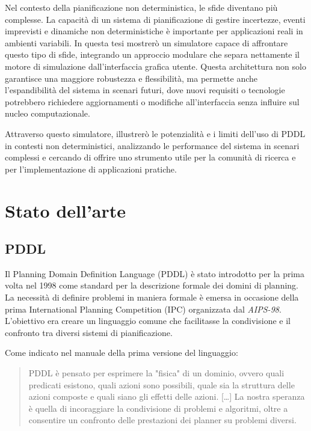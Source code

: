 \documentclass[a4paper, 11pt, titlepage, twoside, openany]{book}
\begin{document}
Nel contesto della pianificazione non deterministica, le sfide diventano più complesse. La capacità di un sistema di pianificazione di gestire incertezze, eventi imprevisti e dinamiche non deterministiche è importante per applicazioni reali in ambienti variabili. In questa tesi mostrerò un simulatore capace di affrontare questo tipo di sfide, integrando un approccio modulare che separa nettamente il motore di simulazione dall'interfaccia grafica utente. Questa architettura non solo garantisce una maggiore robustezza e flessibilità, ma permette anche l'espandibilità del sistema in scenari futuri, dove nuovi requisiti o tecnologie potrebbero richiedere aggiornamenti o modifiche all'interfaccia senza influire sul nucleo computazionale.

Attraverso questo simulatore, illustrerò le potenzialità e i limiti dell'uso di PDDL in contesti non deterministici, analizzando le performance del sistema in scenari complessi e cercando di offrire uno strumento utile per la comunità di ricerca e per l'implementazione di applicazioni pratiche.

\chapter{Stato dell'arte}
\section{PDDL}
Il Planning Domain Definition Language (PDDL) è stato introdotto per la prima volta nel 1998 come standard per la descrizione formale dei domini di planning. La necessità di definire problemi in maniera formale è emersa in occasione della prima International Planning Competition (IPC) organizzata dal \textit{AIPS-98}\cite{AIPS98}. L'obiettivo era creare un linguaggio comune che facilitasse la condivisione e il confronto tra diversi sistemi di pianificazione.

Come indicato nel manuale della prima versione del linguaggio:

\begin{quote}
PDDL è pensato per esprimere la "fisica" di un dominio, ovvero quali predicati esistono, quali azioni sono possibili, quale sia la struttura delle azioni composte e quali siano gli effetti delle azioni. [\ldots] La nostra speranza è quella di incoraggiare la condivisione di problemi e algoritmi, oltre a consentire un confronto delle prestazioni dei planner su problemi diversi.\cite{PDDL1.2}
\end{quote}
\end{document}
